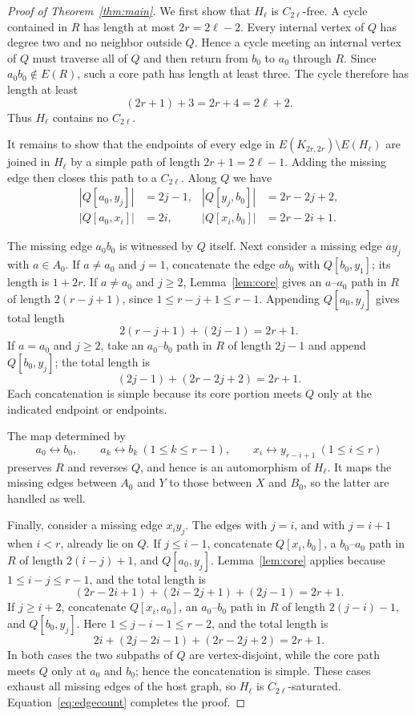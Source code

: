 \documentclass[11pt]{amsart}
\begin{document}
\begin{proof}[Proof of Theorem~\ref{thm:main}]
We first show that $H_\ell$ is $C_{2\ell}$-free. A cycle contained
in $R$ has length at most $2r=2\ell-2$. Every internal vertex of $Q$
has degree two and no neighbor outside $Q$. Hence a cycle meeting an
internal vertex of $Q$ must traverse all of $Q$ and then return from
$b_0$ to $a_0$ through $R$. Since $a_0b_0\notin E(R)$, such a core
path has length at least three. The cycle therefore has length at
least
\[
(2r+1)+3=2r+4=2\ell+2.
\]
Thus $H_\ell$ contains no $C_{2\ell}$.

It remains to show that the endpoints of every edge in
$E(K_{2r,2r})\setminus E(H_\ell)$ are joined in $H_\ell$ by a simple
path of length $2r+1=2\ell-1$. Adding the missing edge then closes
this path to a $C_{2\ell}$. Along $Q$ we have
\begin{align*}
|Q[a_0,y_j]|&=2j-1, & |Q[y_j,b_0]|&=2r-2j+2,\\
|Q[a_0,x_i]|&=2i,   & |Q[x_i,b_0]|&=2r-2i+1.
\end{align*}

The missing edge $a_0b_0$ is witnessed by $Q$ itself. Next consider
a missing edge $ay_j$ with $a\in A_0$.
If $a\ne a_0$ and $j=1$, concatenate the edge $ab_0$ with
$Q[b_0,y_1]$; its length is $1+2r$.
If $a\ne a_0$ and $j\ge2$, Lemma~\ref{lem:core} gives an
$a$--$a_0$ path in $R$ of length $2(r-j+1)$, since
$1\le r-j+1\le r-1$. Appending $Q[a_0,y_j]$ gives total length
\[
2(r-j+1)+(2j-1)=2r+1.
\]
If $a=a_0$ and $j\ge2$, take an $a_0$--$b_0$ path in $R$ of length
$2j-1$ and append $Q[b_0,y_j]$; the total length is
\[
(2j-1)+(2r-2j+2)=2r+1.
\]
Each concatenation is simple because its core portion meets $Q$ only
at the indicated endpoint or endpoints.

The map determined by
\[
a_0\leftrightarrow b_0,\qquad
a_k\leftrightarrow b_k\ (1\le k\le r-1),\qquad
x_i\leftrightarrow y_{r-i+1}\ (1\le i\le r)
\]
preserves $R$ and reverses $Q$, and hence is an automorphism of
$H_\ell$. It maps the missing edges between $A_0$ and $Y$ to those
between $X$ and $B_0$, so the latter are handled as well.

Finally, consider a missing edge $x_i y_j$. The edges with $j=i$,
and with $j=i+1$ when $i<r$, already lie on $Q$.
If $j\le i-1$, concatenate $Q[x_i,b_0]$, a $b_0$--$a_0$ path in $R$
of length $2(i-j)+1$, and $Q[a_0,y_j]$. Lemma~\ref{lem:core}
applies because $1\le i-j\le r-1$, and the total length is
\[
(2r-2i+1)+(2i-2j+1)+(2j-1)=2r+1.
\]
If $j\ge i+2$, concatenate $Q[x_i,a_0]$, an $a_0$--$b_0$ path in $R$
of length $2(j-i)-1$, and $Q[b_0,y_j]$. Here
$1\le j-i-1\le r-2$, and the total length is
\[
2i+(2j-2i-1)+(2r-2j+2)=2r+1.
\]
In both cases the two subpaths of $Q$ are vertex-disjoint, while the
core path meets $Q$ only at $a_0$ and $b_0$; hence the concatenation is
simple. These cases exhaust all missing edges of the host graph, so
$H_\ell$ is $C_{2\ell}$-saturated. Equation~\eqref{eq:edgecount}
completes the proof.
\end{proof}
\end{document}
